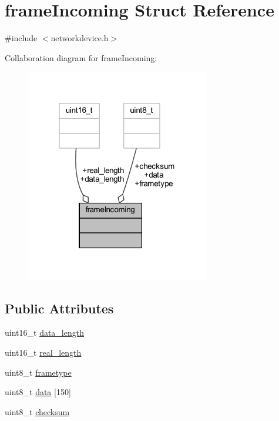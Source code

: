 \hypertarget{structframe_incoming}{}\section{frame\+Incoming Struct Reference}
\label{structframe_incoming}


{\ttfamily \#include $<$networkdevice.\+h$>$}



Collaboration diagram for frame\+Incoming\+:\nopagebreak
\begin{figure}[H]
\begin{center}
\leavevmode
\includegraphics[width=229pt]{structframe_incoming__coll__graph}
\end{center}
\end{figure}
\subsection*{Public Attributes}
\begin{DoxyCompactItemize}
\item 
uint16\+\_\+t \hyperlink{structframe_incoming_a74bdada5ea5e72403e6d350c7ce100b7}{data\+\_\+length}
\item 
uint16\+\_\+t \hyperlink{structframe_incoming_ab3c01fe000d5c79de04c5a3bcbdc8c9d}{real\+\_\+length}
\item 
uint8\+\_\+t \hyperlink{structframe_incoming_a3f025c55a8834939da2ff261b4d896c6}{frametype}
\item 
uint8\+\_\+t \hyperlink{structframe_incoming_a7540149370e29f6b639bffc0f18b3b07}{data} \mbox{[}150\mbox{]}
\item 
uint8\+\_\+t \hyperlink{structframe_incoming_abc6bcaee3bb13564b77f0d71b218c8e9}{checksum}
\end{DoxyCompactItemize}


